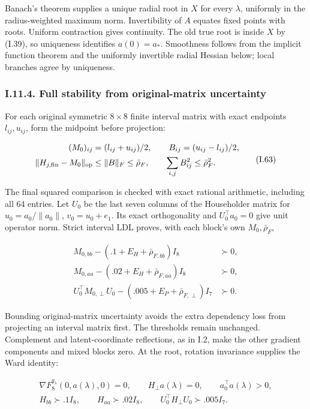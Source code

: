 \documentclass{article}
\begin{document}
Banach's theorem supplies a unique radial root in \(X\) for every
\(\lambda\), uniformly in the radius-weighted maximum norm.
Invertibility of \(A\) equates fixed points with roots. Uniform
contraction gives continuity. The old true root is inside \(X\) by
(I.39), so uniqueness identifies \(a(0)=a_*\). Smoothness follows from
the implicit function theorem and the uniformly invertible radial
Hessian below; local branches agree by uniqueness.

\subsubsection*{I.11.4. Full stability from original-matrix
uncertainty}\label{i.11.4.-full-stability-from-original-matrix-uncertainty}

For each original symmetric \(8\times8\) finite interval matrix with
exact endpoints \(l_{ij},u_{ij}\), form the midpoint before projection:

\[
\begin{aligned}
(M_0)_{ij}&=(l_{ij}+u_{ij})/2,\qquad B_{ij}=(u_{ij}-l_{ij})/2,\\
\|H_{j,\mathrm{fin}}-M_0\|_{\rm op}&\le\|B\|_F
\le\bar\rho_F,\qquad \sum_{i,j}B_{ij}^2\le\bar\rho_F^2.
\end{aligned}
\tag{I.63}
\]

The final squared comparison is checked with exact rational arithmetic,
including all 64 entries. Let \(U_0\) be the last seven columns of the
Householder matrix for \(u_0=a_0/\|a_0\|\), \(v_0=u_0+e_1\). Its exact
orthogonality and \(U_0^\top a_0=0\) give unit operator norm. Strict
interval LDL proves, with each block's own \(M_0,\bar\rho_F\),

\[
\begin{aligned}
M_{0,bb}-(.1+E_H+\bar\rho_{F,bb})I_8&\succ0,\\
M_{0,aa}-(.02+E_H+\bar\rho_{F,aa})I_8&\succ0,\\
U_0^\top M_{0,\perp}U_0-(.005+E_P+\bar\rho_{F,\perp})I_7&\succ0.
\end{aligned}
\tag{I.64}
\]

Bounding original-matrix uncertainty avoids the extra dependency loss
from projecting an interval matrix first. The thresholds remain
unchanged. Complement and latent-coordinate reflections, as in I.2, make
the other gradient components and mixed blocks zero. At the root,
rotation invariance supplies the Ward identity:

\[
\begin{gathered}
\nabla F_8^{q_\lambda}(0,a(\lambda),0)=0,\qquad
H_\perp a(\lambda)=0,\qquad a_0^\top a(\lambda)>0,\\
H_{bb}\succ .1I_8,\qquad H_{aa}\succ .02I_8,\qquad
U_0^\top H_\perp U_0\succ .005I_7.
\end{gathered}
\tag{I.65}
\]
\end{document}
